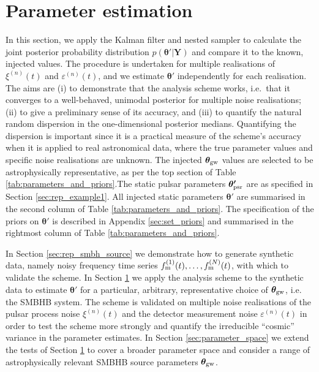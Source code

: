 \documentclass[fleqn,usenatbib,useAMS]{mnras}
\begin{document}
 
\section{Parameter estimation} \label{sec:pe_and_ms} 
In this section, we apply the Kalman filter and nested sampler to calculate the joint posterior probability distribution $p({\boldsymbol{\theta'}} | {\boldsymbol{Y}})$ and compare it to the known, injected values. The procedure is undertaken for multiple realisations of $\xi^{(n)}(t)$ and $\varepsilon^{(n)}(t)$, and we estimate $\boldsymbol{\theta'}$ independently for each realisation. The aims are (i) to demonstrate that the analysis scheme works, i.e.\ that it converges to a well-behaved, unimodal posterior for multiple noise realisations; (ii) to give a preliminary sense of its accuracy, and (iii) to quantify the natural random dispersion in the one-dimensional posterior medians. Quantifying the dispersion is important since it is a practical measure of the scheme's accuracy when it is applied to real astronomical data, where the true parameter values and specific noise realisations are unknown. The injected $\boldsymbol{\theta}_{\rm gw}$ values are selected to be astrophysically representative, as per the top section of Table \ref{tab:parameters_and_priors}.The static pulsar parameters $\boldsymbol{\theta'}_{\rm psr}$ are as specified in Section \ref{sec:rep_example1}. All injected static parameters $\boldsymbol{\theta}'$ are summarised in the second column of Table \ref{tab:parameters_and_priors}. The specification of the priors on $\boldsymbol{\theta'}$ is described in Appendix \ref{sec:set_priors} and summarised in the rightmost column of Table \ref{tab:parameters_and_priors}. 






In Section \ref{sec:rep_smbh_source} we demonstrate how to generate synthetic data, namely noisy frequency time series $f_{\rm m}^{(1)}(t), \dots, f_{\rm m}^{(N)}(t)$, with which to validate the scheme. In Section \ref{sec:pe_and_ms} we apply the analysis scheme to the synthetic data to estimate $\boldsymbol{\theta'}$ for a  particular, arbitrary, representative choice of $\boldsymbol{\theta}_{\rm gw}$, i.e. the SMBHB system. The scheme is validated on multiple noise realisations of the pulsar process noise $\xi^{(n)}(t)$ and the detector measurement noise $\varepsilon^{(n)}(t)$ in order to test the scheme more strongly and quantify the  irreducible ``cosmic'' variance in the parameter estimates. In Section \ref{sec:parameter_space} we extend the tests of Section  \ref{sec:pe_and_ms}
to cover a broader parameter space and consider a range of astrophysically relevant SMBHB source parameters $\boldsymbol{\theta}_{\rm gw}$. 
\end{document}
